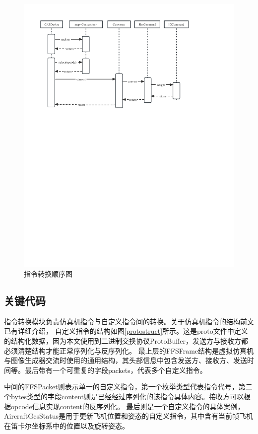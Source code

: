 \begin{figure}[h!]
    \begin{center}
        \includegraphics[width=\textwidth]{pictures/sequence2.pdf}
        \caption{指令转换顺序图}
        \label{seq2}
    \end{center}
\end{figure}
\subsection{关键代码}
指令转换模块负责仿真机指令与自定义指令间的转换。关于仿真机指令的结构前文已有详细介绍，
自定义指令的结构如图\ref{protostruct}所示。这是proto文件中定义的结构化数据，因为本文使用到二进制交换协议ProtoBuffer，发送方与接收方都必须清楚结构才能正常序列化与反序列化。
最上层的FFSFrame结构是虚拟仿真机与图像生成器交流时使用的通用结构，其头部信息中包含发送方、接收方、发送时间等。最后带有一个可重复的字段packets，代表多个自定义指令。
\par
中间的FFSPacket则表示单一的自定义指令，第一个枚举类型代表指令代号，第二个bytes类型的字段content则是已经经过序列化的该指令具体内容。接收方可以根据opcode信息实现content的反序列化。
最后则是一个自定义指令的具体案例，AircraftGcsStatus是用于更新飞机位置和姿态的自定义指令，其中含有当前帧飞机在笛卡尔坐标系中的位置以及旋转姿态。

